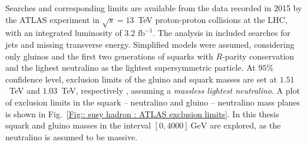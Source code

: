 \documentclass[twoside,english]{uiofysmaster}
\begin{document}
{Searches and corresponding limits are available from the data recorded in 2015 by the ATLAS experiment in $\sqrt{s}=13$~TeV proton-proton collisions at the LHC, with an integrated luminosity of $3.2 \text{ fb}^{-1}$. The analysis in \cite{Aaboud:2016zdn} included searches for jets and missing transverse energy. Simplified models were assumed, considering only gluinos and the first two generations of squarks with $R$-parity conservation and the lighest neutralino as the lightest supersymmetric particle. At $95 \%$ confidence level, exclusion limits of the gluino and squark masses are set at $1.51$~TeV and $1.03$~TeV, respectively \cite{Aaboud:2016zdn}, assuming a \textit{massless lightest neutralino}. A plot of exclusion limits in the squark -- neutralino and gluino -- neutralino mass planes is shown in Fig.\ \ref{Fig:: susy hadron : ATLAS exclusion limits}. In this thesis squark and gluino masses in the interval $[0,4000]~\mathrm{GeV}$ are explored, as the neutralino is assumed to be massive.





%
%


}
\end{document}
